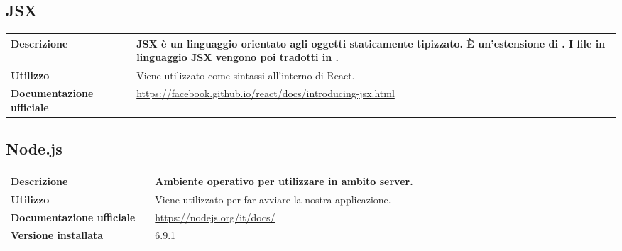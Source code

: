 \vspace{40px}
\subsection{JSX}
\label{JSX}
\begin{table}[H]
	\centering
	\begin{tabular}{p{2cm}p{0.5cm}p{11.5cm}}
		\arrayrulecolor{lightgray}
		\toprule
		\textbf{Descrizione} & &
		JSX è un linguaggio orientato agli oggetti staticamente tipizzato. È un'estensione di \js.
		I file in linguaggio JSX vengono poi tradotti in \js.
		\\ \midrule
		\textbf{Utilizzo} & &
		Viene utilizzato come sintassi all'interno di React.
		\\ \midrule
		\textbf{Documentazione ufficiale} & &
		\url{https://facebook.github.io/react/docs/introducing-jsx.html}
		\\ \bottomrule
	\end{tabular}
\end{table}

\vspace{40px}
\subsection{Node.js}
\label{Node.js}
\begin{table}[H]
	\centering
	\begin{tabular}{p{2cm}p{0.5cm}p{11.5cm}}
		\arrayrulecolor{lightgray}
		\toprule
		\textbf{Descrizione} & &
		Ambiente operativo per utilizzare \js{} in ambito server.
		\\ \midrule
		\textbf{Utilizzo} & &
		Viene utilizzato per far avviare la nostra applicazione.
		\\ \midrule
		\textbf{Documentazione ufficiale} & &
		\url{https://nodejs.org/it/docs/}
		\\ \midrule
		\textbf{Versione installata} & &
		6.9.1
		\\ \bottomrule
	\end{tabular}
\end{table}

\vspace{40px}
